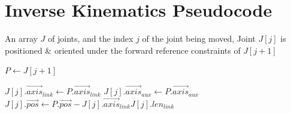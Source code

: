 \chapter{Inverse Kinematics Pseudocode}\label{app:C_ik_pseudocode}

\begin{algorithm}[h!]
\caption{Move Joint under Forward Reference Constraints}
\label{alg:move_reference}
\normalsize{
\begin{algorithmic}[1]
    \Require An array $J$ of joints, and the index $j$ of the joint being moved,
    \Ensure Joint $J[j]$ is positioned \& oriented under the forward reference constraints of $J[j+1]$

        \State $P\gets J[j+1]$
        \Statex

        \State $J[j].\vec{axis}_{link}\gets P.\vec{axis}_{link}$
        \State $J[j].\vec{axis}_{aux}\gets P.\vec{axis}_{aux}$
        \State $J[j].\vec{pos}\gets P.\vec{pos}-J[j].\vec{axis}_{link}J[j].len_{link}$
        \Statex
    \EndFunction
\end{algorithmic}
}
\end{algorithm}

